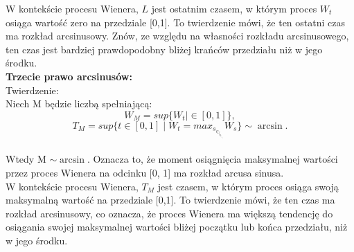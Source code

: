 \documentclass[12pt,letterpaper]{article}
\theoremstyle{definition}
\begin{document}
W kontekście procesu Wienera, $L$ jest ostatnim czasem, w którym proces $W_t$ osiąga wartość zero na przedziale [0,1]. To twierdzenie mówi, że ten ostatni czas ma rozkład arcsinusowy. Znów, ze względu na własności rozkładu arcsinusowego, ten czas jest bardziej prawdopodobny bliżej krańców przedziału niż w jego środku.\\

\textbf{Trzecie prawo arcsinusów:}\\

Twierdzenie:\\

Niech M będzie liczbą spełniającą:
$$W_M = sup\{W_t\mid \in [0, 1]\}, $$
$$T_M = sup\{t \in [0,1] \mid W_t = max_s_\in_[_0_,_1_] W_s\}\sim \arcsin .$$\\
Wtedy M $\sim \arcsin$. Oznacza to, że moment osiągnięcia maksymalnej wartości przez proces Wienera na odcinku [0, 1] ma rozkład arcusa sinusa.\\

W kontekście procesu Wienera, $T_M$ jest czasem, w którym proces osiąga swoją maksymalną wartość na przedziale [0,1]. To twierdzenie mówi, że ten czas ma rozkład arcsinusowy, co oznacza, że proces Wienera ma większą tendencję do osiągania swojej maksymalnej wartości bliżej początku lub końca przedziału, niż w jego środku.\\
\end{document}
